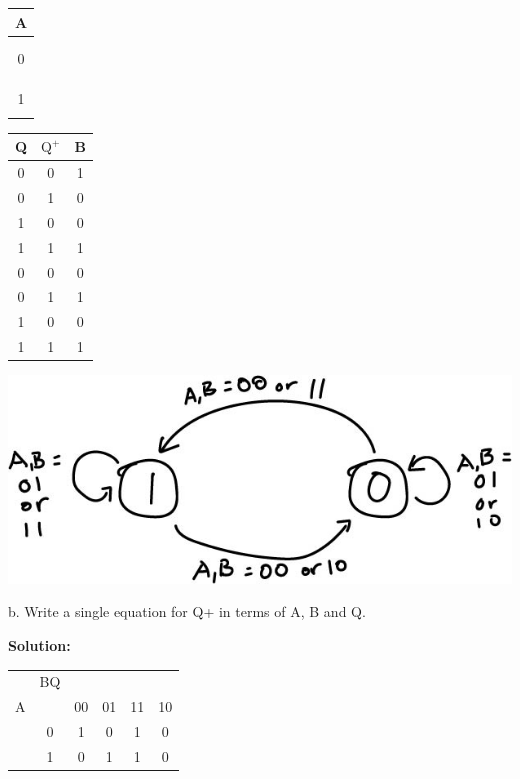 \documentclass{article}
\begin{document}
    \begin{center}
        \begin{tabular} {c|}
            A  \\
            \hline
            \\
            \\
            0 \\
            \\
            \hline
            \\
            \\
            1 \\
            \\
        \end{tabular}
        \begin{tabular} {cc|c}
            Q & $\text{Q}^+$ & B \\
            \hline
            0 & 0 & 1 \\
            0 & 1 & 0 \\
            1 & 0 & 0 \\
            1 & 1 & 1 \\
            \hline
            0 & 0 & 0 \\
            0 & 1 & 1 \\
            1 & 0 & 0 \\
            1 & 1 & 1 \\
        \end{tabular}
    \end{center}

    \begin{center}
        \includegraphics[scale=.35]{HW4_q4.jpg}
    \end{center}

    b. Write a single equation for Q+ in terms of A, B and Q.

    \textbf{Solution:}

    \begin{center}
        \begin{tabular} {cc|cccc}
            & BQ & &&& \\
            A && 00 & 01 & 11 & 10 \\
            \hline
            & 0 & 1 & 0 & 1 & 0 \\
            & 1 & 0 & 1 & 1 & 0 \\
        \end{tabular}
    \end{center}
\end{document}
